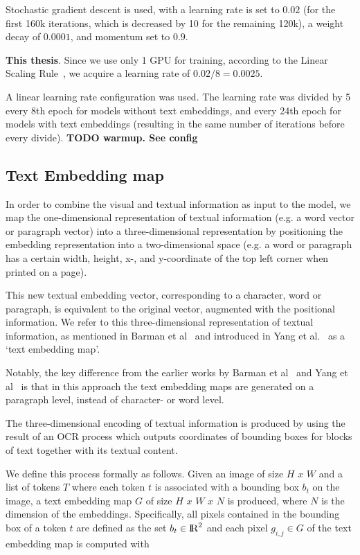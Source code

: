 \documentclass[oneside, english, bibtex]{kththesis}
\begin{document}
Stochastic gradient descent is used, with a learning rate is set to $0.02$ (for the first 160k iterations, which is decreased by 10 for the remaining 120k), a weight decay of $0.0001$, and momentum set to $0.9$.

\textbf{This thesis}. Since we use only 1 GPU for training, according to the Linear Scaling Rule~\cite{DBLP:journals/corr/GoyalDGNWKTJH17}, we acquire a learning rate of $0.02/8=0.0025$.

A linear learning rate configuration was used. The learning rate was divided by 5 every 8th epoch for models without text embeddings, and every 24th epoch for models with text embeddings (resulting in the same number of iterations before every divide). \textbf{TODO warmup. See config}

\subsection{Text Embedding map}

In order to combine the visual and textual information as input to the model, we map the one-dimensional representation of textual information (e.g. a word vector or paragraph vector) into a three-dimensional representation by positioning the embedding representation into a two-dimensional space (e.g. a word or paragraph has a certain width, height, x-, and y-coordinate of the top left corner when printed on a page).

This new textual embedding vector, corresponding to a character, word or paragraph, is equivalent to the original vector, augmented with the positional information. We refer to this three-dimensional representation of textual information, as mentioned in Barman et al~\cite{jdmdh:7097} and introduced in Yang et al.~\cite{DBLP:journals/corr/YangYAKKG17} as a ‘text embedding map’.

Notably, the key difference from the earlier works by Barman et al~\cite{jdmdh:7097} and Yang et al~\cite{DBLP:journals/corr/YangYAKKG17} is that in this approach the text embedding maps are generated on a paragraph level, instead of character- or word level.

The three-dimensional encoding of textual information is produced by using the result of an OCR process which outputs coordinates of bounding boxes for blocks of text together with its textual content.

We define this process formally as follows. Given an image of size $H$ $x$ $W$ and a list of tokens $T$ where each token $t$ is associated with a bounding box $b_t$ on the image, a text embedding map $G$ of size $H$ $x$ $W$ $x$ $N$ is produced, where $N$ is the dimension of the embeddings. Specifically, all pixels contained in the bounding box of a token $t$ are defined as the set $b_t \in {\rm I\!R}^2$ and each pixel $g_{i,j} \in G$ of the text embedding map is computed with
\end{document}

